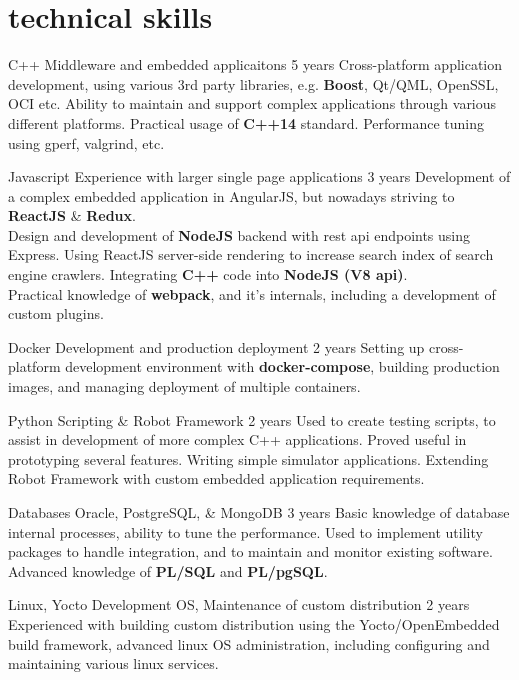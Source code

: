 \documentclass[]{friggeri-cv} %
\begin{document}

\section{technical skills}
\begin{entrylist}
\entry
{C++}
{Middleware and embedded applicaitons}
{5 years}
{Cross-platform application development, using various 3rd party libraries, e.g. \textbf{Boost}, Qt/QML, OpenSSL, OCI etc. Ability to maintain and support complex applications through various different platforms. Practical usage of \textbf{C++14} standard. Performance tuning using gperf, valgrind, etc.}

\entry
{Javascript}
{Experience with larger single page applications}
{3 years}
{Development of a complex embedded application in AngularJS, but nowadays striving to \textbf{ReactJS} \& \textbf{Redux}.
\\
Design and development of \textbf{NodeJS} backend with rest api endpoints using Express. Using ReactJS server-side rendering to increase search index of search engine crawlers. Integrating \textbf{C++} code into \textbf{NodeJS (V8 api)}.
\\
Practical knowledge of \textbf{webpack}, and it's internals, including a development of custom plugins.}

\entry
{Docker}
{Development and production deployment}
{2 years}
{Setting up cross-platform development environment with \textbf{docker-compose}, building production images, and managing deployment of multiple containers.}

\entry
{Python}
{Scripting \& Robot Framework}
{2 years}
{Used to create testing scripts, to assist in development of more complex C++ applications. Proved useful in prototyping several features. Writing simple simulator applications. Extending Robot Framework with custom embedded application requirements.}

\entry
{Databases}
{Oracle, PostgreSQL, \& MongoDB}
{3 years}
{Basic knowledge of database internal processes, ability to tune the performance. Used to implement utility packages to handle integration, and to maintain and monitor existing software. Advanced knowledge of \textbf{PL/SQL} and \textbf{PL/pgSQL}.}

\entry
{Linux, Yocto}
{Development OS, Maintenance of custom distribution}
{2 years}
{Experienced with building custom distribution using the Yocto/OpenEmbedded build framework,
advanced linux OS administration, including configuring and maintaining various linux services.}

\end{entrylist}
\end{document}
